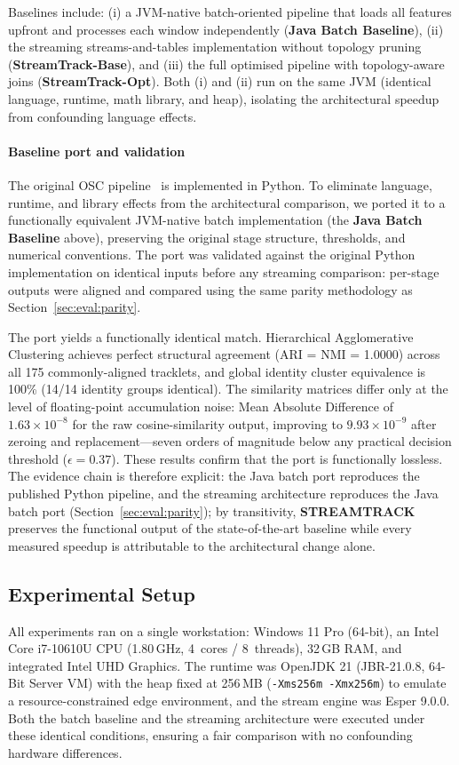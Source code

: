\documentclass[5p,times]{elsarticle}
\begin{document}
Baselines include: (i) a JVM-native batch-oriented pipeline that loads all features upfront and processes each window independently (\textbf{Java Batch Baseline}), (ii) the streaming streams-and-tables implementation without topology pruning (\textbf{StreamTrack-Base}), and (iii) the full optimised pipeline with topology-aware joins (\textbf{StreamTrack-Opt}). Both (i) and (ii) run on the same JVM (identical language, runtime, math library, and heap), isolating the architectural speedup from confounding language effects.

\paragraph{Baseline port and validation}
The original OSC pipeline~\cite{yoshida2024overlap} is implemented in Python. To eliminate language, runtime, and library effects from the architectural comparison, we ported it to a functionally equivalent JVM-native batch implementation (the \textbf{Java Batch Baseline} above), preserving the original stage structure, thresholds, and numerical conventions. The
port was validated against the original Python implementation on identical inputs before any streaming comparison: per-stage outputs were aligned and compared using the same parity
methodology as Section~\ref{sec:eval:parity}.

The port yields a functionally identical match. Hierarchical Agglomerative Clustering achieves perfect structural agreement (ARI = NMI = 1.0000) across all 175 commonly-aligned tracklets, and global identity cluster equivalence is 100\% (14/14 identity groups identical). The similarity matrices differ only at the level of floating-point accumulation noise: Mean Absolute Difference of $1.63 \times 10^{-8}$ for the raw cosine-similarity output, improving to $9.93 \times 10^{-9}$ after zeroing and replacement---seven orders of magnitude below any practical decision threshold ($\epsilon = 0.37$). These results confirm that the port is functionally lossless.
The evidence chain is therefore explicit: the Java batch port reproduces the published Python pipeline, and the streaming architecture reproduces the Java batch port (Section~\ref{sec:eval:parity}); by transitivity, \textbf{STREAMTRACK} preserves the functional output of the state-of-the-art baseline while every measured speedup is attributable to the architectural change alone.

\subsection{Experimental Setup}
All experiments ran on a single workstation: Windows 11 Pro (64-bit), an Intel Core i7-10610U CPU (1.80\,GHz, 4~cores / 8~threads), 32\,GB RAM, and integrated Intel UHD Graphics. The runtime was OpenJDK 21 (JBR-21.0.8, 64-Bit Server VM) with the heap fixed at 256\,MB (\texttt{-Xms256m -Xmx256m}) to emulate a resource-constrained edge environment, and the stream engine was Esper 9.0.0. Both the batch baseline and the streaming architecture were executed under these identical conditions, ensuring a fair comparison with no confounding hardware differences.
\end{document}
